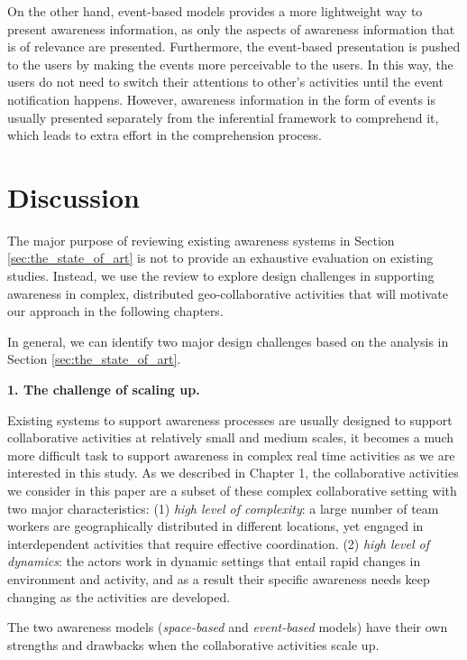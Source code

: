 On the other hand, event-based models provides a more lightweight way to present awareness information, as only the aspects of awareness information that is of relevance are presented. Furthermore, the event-based presentation is pushed to the users by making the events more perceivable to the users. In this way, the users do not need to switch their attentions to other’s activities until the event notification happens. However, awareness information in the form of events is usually presented separately from the inferential framework to comprehend it, which leads to extra effort in the comprehension process.


\section{Discussion} %
\label{sec:review_discussion}
The major purpose of reviewing existing awareness systems in Section \ref{sec:the_state_of_art} is not to provide an exhaustive evaluation on existing studies. Instead, we use the review to explore design challenges in supporting awareness in complex, distributed geo-collaborative activities that will motivate our approach in the following chapters. 

In general, we can identify two major design challenges based on the analysis in Section \ref{sec:the_state_of_art}.

\textbf{1. The challenge of scaling up.}

Existing systems to support awareness processes are usually designed to support collaborative activities at relatively small and medium scales, it becomes a much more difficult task to support awareness in complex real time activities as we are interested in this study. As we described in Chapter 1, the collaborative activities we consider in this paper are a subset of these complex collaborative setting with two major characteristics: (1) \emph{high level of complexity}: a large number of team workers are geographically distributed in different locations, yet engaged in interdependent activities that require effective coordination. (2) \emph{high level of dynamics}: the actors work in dynamic settings that entail rapid changes in environment and activity, and as a result their specific awareness needs keep changing as the activities are developed.

The two awareness models (\emph{space-based} and \emph{event-based} models) have their own strengths and drawbacks when the collaborative activities scale up. 

